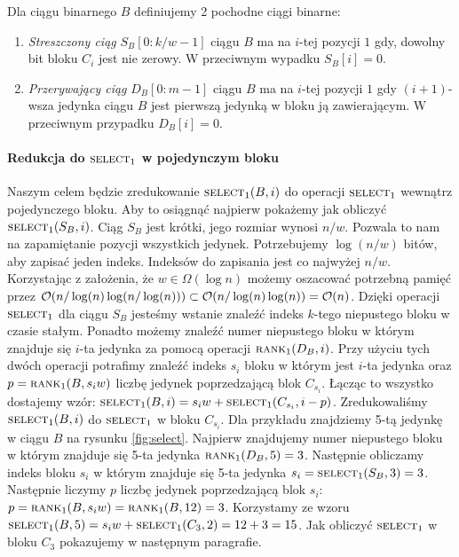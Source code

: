 Dla ciągu binarnego $B$ definiujemy 2 pochodne ciągi binarne:
\begin{enumerate}[nosep]
    \item \emph{Streszczony ciąg} $S_B[0:k/w-1]$ ciągu $B$ ma na $i$-tej pozycji $1$ gdy, dowolny bit bloku $C_i$ jest nie zerowy. W przeciwnym wypadku $S_B[i] = 0$.
    \item \emph{Przerywający ciąg} $D_B[0:m-1]$ ciągu $B$ ma na $i$-tej pozycji $1$ gdy $(i+1)$-wsza jedynka ciągu $B$ jest pierwszą jedynką w bloku ją zawierającym. W przeciwnym przypadku $D_B[i]=0$.
\end{enumerate}
\vspace{-0.5em}\paragraph{Redukcja do $\textsc{select}_1$ w pojedynczym bloku}
Naszym celem będzie zredukowanie $\textsc{select}_1(B, i)$ do operacji $\textsc{select}_1$ wewnątrz pojedynczego bloku. Aby to osiągnąć najpierw pokażemy jak obliczyć $\textsc{select}_1(S_B, i)$. Ciąg $S_B$ jest krótki, jego rozmiar wynosi $n/w$. Pozwala to nam na zapamiętanie pozycji wszystkich jedynek. Potrzebujemy $\log(n/w)$ bitów, aby zapisać jeden indeks. Indeksów do zapisania jest co najwyżej $n/w$. Korzystając z założenia, że $w \in \Omega(\log n)$ możemy oszacować potrzebną pamięć przez $\mathcal{O}(n/\log(n) \log(n/\log(n))) \subset \mathcal{O}(n/\log(n) \log(n)) = \mathcal{O}(n)$. Dzięki operacji $\textsc{select}_1$ dla ciągu $S_B$ jesteśmy wstanie znaleźć indeks $k$-tego niepustego bloku w czasie stałym. Ponadto możemy znaleźć numer niepustego bloku w którym znajduje się $i$-ta jedynka za pomocą operacji $\textsc{rank}_1(D_B, i)$. Przy użyciu tych dwóch operacji potrafimy znaleźć indeks $s_i$ bloku w którym jest $i$-ta jedynka oraz $p=\textsc{rank}_1(B, s_iw)$ liczbę jedynek poprzedzającą blok $C_{s_i}$. Łącząc to wszystko dostajemy wzór: $\textsc{select}_1(B, i) = s_iw + \textsc{select}_1(C_{s_i}, i-p)$. Zredukowaliśmy $\textsc{select}_1(B, i)$ do $\textsc{select}_1$ w bloku $C_{s_i}$. Dla przykładu znajdziemy 5-tą jedynkę w ciągu $B$ na rysunku \ref{fig:select}. Najpierw znajdujemy numer niepustego bloku w którym znajduje się 5-ta jedynka $\textsc{rank}_1(D_B,5) = 3$. Następnie obliczamy indeks bloku $s_i$ w którym znajduje się 5-ta jedynka $s_i = \textsc{select}_1(S_B, 3) = 3$. Następnie liczymy $p$ liczbę jedynek poprzedzającą blok $s_i$: $p=\textsc{rank}_1(B, s_iw) = \textsc{rank}_1(B, 12) = 3$. Korzystamy ze wzoru $\textsc{select}_1(B, 5) = s_iw + \textsc{select}_1(C_{3}, 2) = 12+3 = 15$. Jak obliczyć $\textsc{select}_1$ w bloku $C_{3}$ pokazujemy w następnym paragrafie. 
